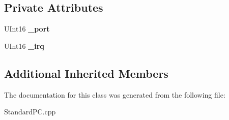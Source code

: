 \subsection*{Private Attributes}
\begin{DoxyCompactItemize}
\item 
\mbox{\label{class_standard_p_c___internal_1_1_factory_1_1_match___i_d_e_ae3cd8979795d0d0b753a7ed9708f47d9}} 
U\+Int16 {\bfseries \+\_\+port}
\item 
\mbox{\label{class_standard_p_c___internal_1_1_factory_1_1_match___i_d_e_a89adb4ffae634c896ab7ed62acf6e27a}} 
U\+Int16 {\bfseries \+\_\+irq}
\end{DoxyCompactItemize}
\subsection*{Additional Inherited Members}


The documentation for this class was generated from the following file\+:\begin{DoxyCompactItemize}
\item 
Standard\+P\+C.\+cpp\end{DoxyCompactItemize}
